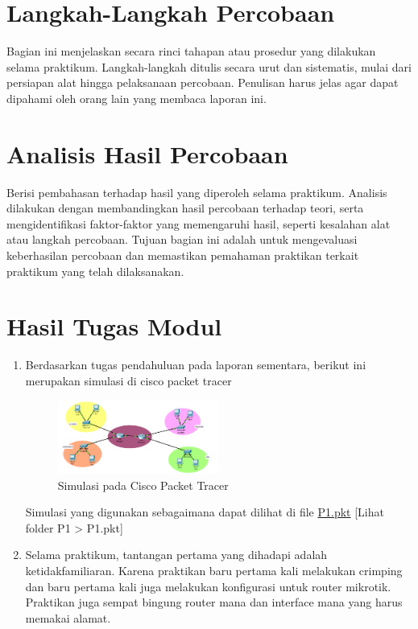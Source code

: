 \section{Langkah-Langkah Percobaan}
Bagian ini menjelaskan secara rinci tahapan atau prosedur yang dilakukan selama praktikum. Langkah-langkah ditulis secara urut dan sistematis, mulai dari persiapan alat hingga pelaksanaan percobaan. Penulisan harus jelas agar dapat dipahami oleh orang lain yang membaca laporan ini.

\section{Analisis Hasil Percobaan}
Berisi pembahasan terhadap hasil yang diperoleh selama praktikum. Analisis dilakukan dengan membandingkan hasil percobaan terhadap teori, serta mengidentifikasi faktor-faktor yang memengaruhi hasil, seperti kesalahan alat atau langkah percobaan. Tujuan bagian ini adalah untuk mengevaluasi keberhasilan percobaan dan memastikan pemahaman praktikan terkait praktikum yang telah dilaksanakan.

\section{Hasil Tugas Modul}
\begin{enumerate}
  \item Berdasarkan tugas pendahuluan pada laporan sementara, berikut ini merupakan simulasi di cisco packet tracer \\
  	\begin{figure}[H] 
    \centering
    \includegraphics[width=0.5\textwidth]{P1/img/tupen3.png}
    \caption{Simulasi pada Cisco Packet Tracer}
    \label{fig: Simulasi pada Cisco Packet Tracer}
	\end{figure}
  Simulasi yang digunakan sebagaimana dapat dilihat di file \href{run:P1.pkt}{P1.pkt} [Lihat folder P1 > P1.pkt]
  \item 
  Selama praktikum, tantangan pertama  yang dihadapi adalah ketidakfamiliaran. Karena praktikan baru pertama kali melakukan crimping dan baru pertama kali juga melakukan konfigurasi untuk router mikrotik. Praktikan juga sempat bingung router mana dan interface mana yang harus memakai alamat.
\end{enumerate}

